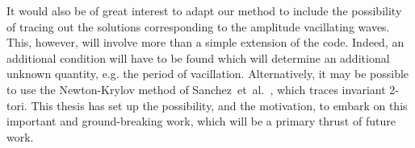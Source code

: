 It would also be of great interest to adapt our method to include the possibility of tracing out the solutions corresponding to the amplitude vacillating waves. This, however, will involve more than a simple extension of the code.  Indeed, an additional condition will have to be found which will determine an additional unknown quantity, e.g. the period of vacillation.  Alternatively, it may be possible to use the {Newton-Krylov} method of Sanchez~et~al.~\cite{sanchez2010computation}, which traces invariant {2-tori}.  This thesis has set up the possibility, and the motivation, to embark on this important and ground-breaking work, which will be a primary thrust of future work.



%
